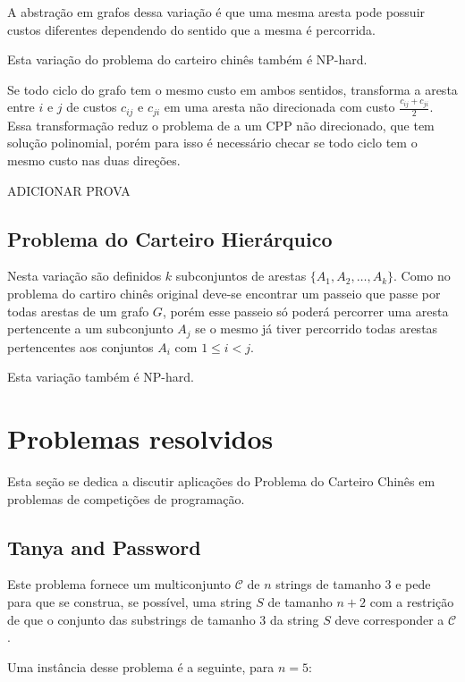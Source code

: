 \documentclass[12pt, a4paper]{article}
\begin{document}
        A abstração em grafos dessa variação é que uma mesma aresta pode possuir custos diferentes dependendo do sentido que a mesma é percorrida.

        Esta variação do problema do carteiro chinês também é NP-hard.
        

        Se todo ciclo do grafo tem o mesmo custo em ambos sentidos, transforma a aresta entre $i$ e $j$ de custos $c_{ij}$ e $c_{ji}$ em uma aresta não direcionada com custo $\frac{c_{ij} + c_{ji}}{2}$. Essa transformação reduz o problema de a um CPP não direcionado, que tem solução polinomial, porém para isso é necessário checar se todo ciclo tem o mesmo custo nas duas direções.

        ADICIONAR PROVA

    \subsection{Problema do Carteiro Hierárquico}

    Nesta variação são definidos $k$ subconjuntos de arestas $\{A_1, A_2, \dots, A_k\}$.
    Como no problema do cartiro chinês original deve-se encontrar um passeio que passe por todas arestas de um grafo $G$, porém esse passeio só poderá percorrer uma aresta pertencente a um subconjunto $A_j$ se o mesmo já tiver percorrido todas arestas pertencentes aos conjuntos $A_i$ com $1 \leq i < j$.

    Esta variação também é NP-hard.


    \section{Problemas resolvidos}

        Esta seção se dedica a discutir aplicações do Problema do Carteiro Chinês em problemas de competições de programação.

        \subsection{Tanya and Password\cite{tanya}}

        Este problema fornece um multiconjunto $\mathcal{C}$ de $n$ strings de tamanho 3 e pede para que se construa, se possível, uma string $S$ de tamanho $n+2$ com a restrição de que o conjunto das substrings de tamanho 3 da string $S$ deve corresponder a $\mathcal{C}$.

        Uma instância desse problema é a seguinte, para $n=5$:
\end{document}
